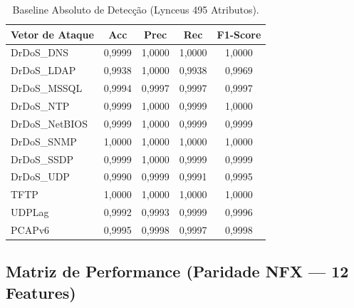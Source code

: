 \documentclass[11pt,a4paper]{article}
\begin{document}
\begin{table}[H]
\centering
\begin{tabular}{lcccc}
\toprule
\textbf{Vetor de Ataque} & \textbf{Acc} & \textbf{Prec} & \textbf{Rec} & \textbf{F1-Score} \\
\midrule
DrDoS\_DNS & 0,9999 & 1,0000 & 1,0000 & 1,0000 \\
DrDoS\_LDAP & 0,9938 & 1,0000 & 0,9938 & 0,9969 \\
DrDoS\_MSSQL & 0,9994 & 0,9997 & 0,9997 & 0,9997 \\
DrDoS\_NTP & 0,9999 & 1,0000 & 0,9999 & 1,0000 \\
DrDoS\_NetBIOS & 0,9999 & 1,0000 & 0,9999 & 0,9999 \\
DrDoS\_SNMP & 1,0000 & 1,0000 & 1,0000 & 1,0000 \\
DrDoS\_SSDP & 0,9999 & 1,0000 & 0,9999 & 0,9999 \\
DrDoS\_UDP & 0,9990 & 0,9999 & 0,9991 & 0,9995 \\
TFTP & 1,0000 & 1,0000 & 1,0000 & 1,0000 \\
UDPLag & 0,9992 & 0,9993 & 0,9999 & 0,9996 \\
PCAPv6 & 0,9995 & 0,9998 & 0,9997 & 0,9998 \\
\bottomrule
\end{tabular}
\caption{Baseline Absoluto de Detecção (Lynceus 495 Atributos).}
\end{table}

\subsection{Matriz de Performance (Paridade NFX — 12 Features)}
\end{document}
